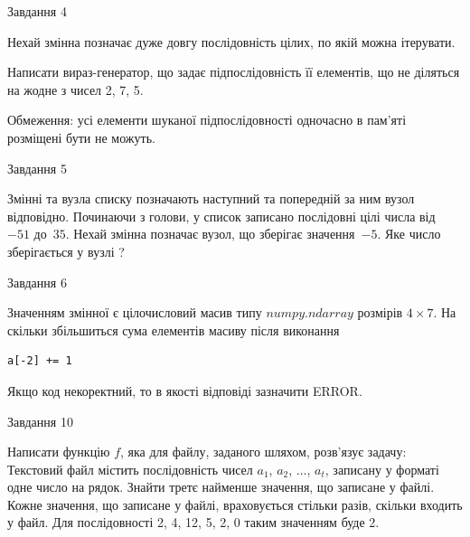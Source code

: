 \documentclass[12pt, ukrainian]{article}
\begin{document}
{\begin{minipage}[t]{8.0cm}
\end{minipage}


               
{\begin{center}Завдання {4}\end{center}}
\vspace{-4mm}
Нехай змінна  позначає дуже довгу послідовність цілих, по якій можна ітерувати.

Написати вираз-генератор, що задає підпослідовність її елементів, що не діляться на жодне з чисел 2, 7, 5.

Обмеження: усі елементи шуканої підпослідовності одночасно в пам'яті розміщені бути не можуть.\par

\vspace{10mm}
               
{\begin{center}Завдання {5}\end{center}}
\vspace{-4mm}
Змінні  та  вузла списку позначають наступний та попередній за ним вузол відповідно. Починаючи з голови, у список записано послідовні цілі числа від~$-51$ до~$35$. Нехай змінна  позначає вузол, що зберігає значення~$-5$.
Яке число зберігається у вузлі  ?\par

               
{\begin{center}Завдання {6}\end{center}}
\vspace{-4mm}
Значенням змінної  є цілочисловий масив типу $numpy.ndarray$ розмірів $4{\times}7$. На скільки збільшиться сума елементів масиву  після виконання
\begin{verbatim}
a[-2] += 1
\end{verbatim}


Якщо код некоректний, то в якості відповіді зазначити ERROR.\par

               
{\begin{center}Завдання {10}\end{center}}
\vspace{-4mm}

Написати функцію $f$, яка для файлу, заданого шляхом, розв’язує задачу:\\ Текстовий файл містить послідовність чисел $a_1$, $a_2$, $\ldots$, $a_t$, записану у форматі одне число на рядок. Знайти третє найменше значення, що записане у файлі. Кожне значення, що записане у файлі, враховується стільки разів, скільки входить у файл. Для послідовності 2, 4, 12, 5, 2, 0 таким значенням буде 2.

}
\end{document}
